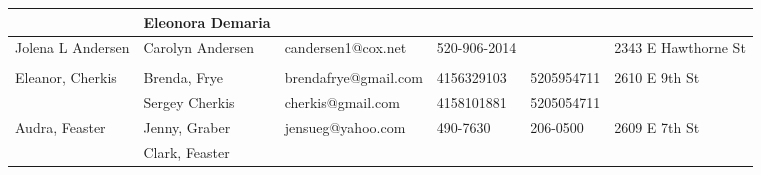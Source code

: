 \documentclass[landscape]{article}\usepackage[]{graphicx}\usepackage[]{color}
\begin{document}
\begin{longtable}{p{70pt}|p{75pt}|p{120pt}|p{60pt}|p{60pt}|p{120pt}|}
 & Eleonora Demaria &  &  &  & \\
\hline
\multirow{2}{70pt}{Jolena L Andersen} & Carolyn Andersen & candersen1@cox.net & 520-906-2014 &  & \multirow{2}{100pt}{2343 E Hawthorne St} \\
 &  &  &  &  & \\
\hline
\multirow{2}{70pt}{Eleanor, Cherkis} & Brenda, Frye & brendafrye@gmail.com & 4156329103 & 5205954711 & \multirow{2}{100pt}{2610 E 9th St} \\
 & Sergey Cherkis & cherkis@gmail.com & 4158101881 & 5205054711 & \\
\hline
\multirow{2}{70pt}{Audra, Feaster} & Jenny, Graber & jensueg@yahoo.com & 490-7630 & 206-0500 & \multirow{2}{100pt}{2609 E 7th St} \\
 & Clark, Feaster &  &  &  & \\
\hline
\end{longtable}
\newpage
\end{document}
